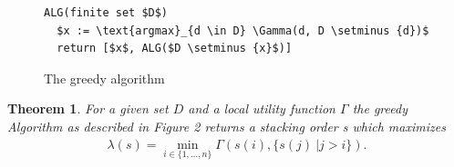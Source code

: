 \documentclass[a4paper,11pt]{article}
\newtheorem{theorem}{Theorem}
\begin{document}
\begin{figure}[!t]
  \begin{lstlisting}[mathescape=true ]
ALG(finite set $D$)
  $x := \text{argmax}_{d \in D} \Gamma(d, D \setminus {d})$
  return [$x$, ALG($D \setminus {x}$)]
  \end{lstlisting}
  \caption{The greedy algorithm}
\end{figure}

\begin{theorem}
  For a given set $D$ and a local utility function $\Gamma$ the greedy Algorithm as described in Figure 2 returns a stacking order s which maximizes\begin{align*}
    \lambda(s) = \min_{i \in \{1,\dots,n\}} \Gamma(s(i), \{s(j)\ | j > i\}).
  \end{align*}
\end{theorem}
\end{document}
